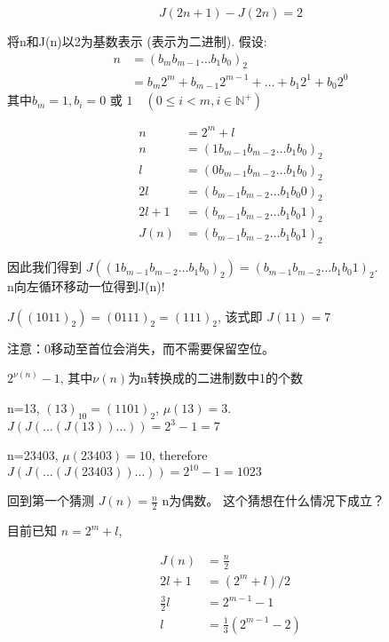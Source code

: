 \begin{equation}\label{JosephRecur1}
	J(2n+1)-J(2n)=2
\end{equation}

\begin{remark}
	将n和J(n)以2为基数表示 (表示为二进制). 假设:\\
	\begin{align*}
		n&=(b_mb_{m-1} \dots b_1 b_0)_2\\
		&=b_m2^m+b_{m-1}2^{m-1}+\dots+b_1 2^1+b_0 2^0
	\end{align*}
其中$ b_m = 1, b_i = 0\text{ 或 }1  \quad(0\leqslant i <m, i\in\mathbb{N}^+)$
\end{remark}

\begin{align*}
	n&=2^m+l\\
	n&=(1 b_{m-1} b_{m-2}\dots b_1 b_0)_2\\
	l&=(0 b_{m-1} b_{m-2}\dots b_1 b_0)_2\\
	2l&=(b_{m-1} b_{m-2}\dots b_1 b_0 0)_2\\
	2l+1&=(b_{m-1} b_{m-2}\dots b_1 b_0 1)_2\\
	J(n)&=(b_{m-1} b_{m-2}\dots b_1 b_0 1)_2
\end{align*}

因此我们得到 $ J((1 b_{m-1} b_{m-2}\dots b_1 b_0)_2)=(b_{m-1} b_{m-2}\dots b_1 b_0 1)_2 $.\\
n向左循环移动一位得到J(n)!\\

\begin{case}
	$ J((1011)_2) = (0111)_2 = (111)_2 $, 该式即 $ J(11) = 7 $
\end{case}
注意：0移动至首位会消失，而不需要保留空位。

$ 2^{\nu(n)}-1 $, 其中$ \nu(n) $为n转换成的二进制数中1的个数

\begin{case}
	n=13, $ (13)_{10} = (1101)_2 $, $ \mu(13) = 3 $.\\
	$ J(J(\dots(J(13))\dots)) = 2^3-1 = 7 $
\end{case}
\begin{case}
	n=23403, $ \mu(23403)=10 $, therefore 	$ J(J(\dots(J(23403))\dots)) = 2^{10}-1 = 1023 $
\end{case}

回到第一个猜测 $ J(n) = \frac{n}{2} $ n为偶数。
这个猜想在什么情况下成立？

目前已知 $ n = 2^m + l $, 

\begin{align*}
	J(n) &= \frac{n}{2}\\
	2l+1 &= (2^m+l)/2\\
	\frac{3}{2} l &=2^{m-1}-1\\
	l&=\frac{1}{3}(2^{m-1}-2)
\end{align*}

